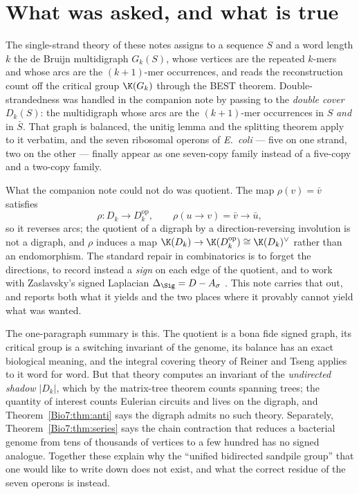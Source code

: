 \section{What was asked, and what is true}

The single-strand theory of these notes assigns to a sequence $S$ and a word length $k$ the
de Bruijn multidigraph $G_k(S)$, whose vertices are the repeated $k$-mers and whose arcs are
the $(k{+}1)$-mer occurrences, and reads the reconstruction count off the critical group
$\K(G_k)$ through the BEST theorem. Double-strandedness was handled in the companion note by
passing to the \emph{double cover} $D_k(S)$: the multidigraph whose arcs are the
$(k{+}1)$-mer occurrences in $S$ \emph{and} in $\bar S$. That graph is balanced, the unitig
lemma and the splitting theorem apply to it verbatim, and the seven ribosomal operons of
\emph{E.\ coli} --- five on one strand, two on the other --- finally appear as one
seven-copy family instead of a five-copy and a two-copy family.

What the companion note could not do was quotient. The map $\rho(v)=\bar v$ satisfies
\[
  \rho\colon D_k \longrightarrow D_k^{\mathrm{op}},\qquad
  \rho(u\to v)=\bar v\to\bar u ,
\]
so it reverses arcs; the quotient of a digraph by a direction-reversing involution is not a
digraph, and $\rho$ induces a map $\K(D_k)\to\K(D_k^{\mathrm{op}})\cong\K(D_k)^\vee$ rather
than an endomorphism. The standard repair in combinatorics is to forget the directions, to
record instead a \emph{sign} on each edge of the quotient, and to work with Zaslavsky's
signed Laplacian $\Delta_\Sig=D-A_\sigma$ \cite{Zas82}. This note carries that out, and
reports both what it yields and the two places where it provably cannot yield what was
wanted.

The one-paragraph summary is this. The quotient is a bona fide signed graph, its critical
group is a switching invariant of the genome, its balance has an exact biological meaning,
and the integral covering theory of Reiner and Tseng \cite{RT14} applies to it word for word.
But that theory computes an invariant of the \emph{undirected shadow} $|D_k|$, which by the
matrix-tree theorem counts spanning trees; the quantity of interest counts Eulerian circuits
and lives on the digraph, and Theorem~\ref{Bio7:thm:anti} says the digraph admits no such theory.
Separately, Theorem~\ref{Bio7:thm:series} says the chain contraction that reduces a bacterial
genome from tens of thousands of vertices to a few hundred has no signed analogue. Together
these explain why the ``unified bidirected sandpile group'' that one would like to write down
does not exist, and what the correct residue of the seven operons is instead.

